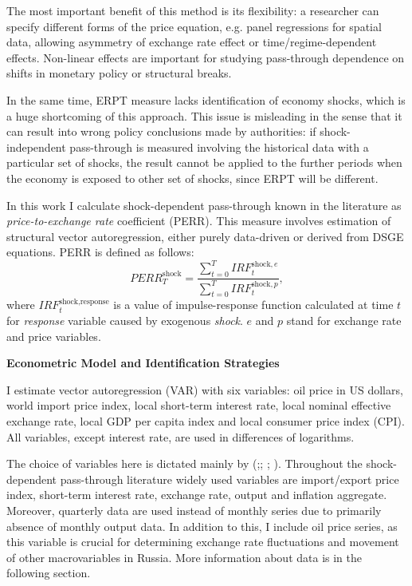 \documentclass[12pt, a4paper]{extarticle}
\begin{document}
The most important benefit of this method is its flexibility: a researcher can specify different forms of the price equation, e.g. panel regressions for spatial data, allowing asymmetry of exchange rate effect or time/regime-dependent effects. Non-linear effects are important for studying pass-through dependence on shifts in monetary policy or structural breaks. 

In the same time, ERPT measure lacks identification of economy shocks, which is a huge shortcoming of this approach. This issue is misleading in the sense that it can result into wrong policy conclusions made by authorities: if shock-independent pass-through is measured involving the historical data with a particular set of shocks, the result cannot be applied to the further periods when the economy is exposed to other set of shocks, since ERPT will be different.

In this work I calculate shock-dependent pass-through known in the literature as \textit{price-to-exchange rate} coefficient (PERR). This measure involves estimation of structural vector autoregression, either purely data-driven or derived from DSGE equations. PERR is defined as follows:
\begin{equation}
	PERR^{\text{shock}}_{T} = \frac{\sum_{t=0}^{T}IRF^{\text{shock}, e}_{t}}{\sum_{t=0}^{T}IRF_{t}^{\text{shock}, p}},
\end{equation}
where $IRF^{\text{shock}, \text{response}}_{t}$ is a value of impulse-response function calculated at time $t$ for \textit{response} variable caused by exogenous \textit{shock}. $e$ and $p$ stand for exchange rate and price variables.

\begin{center}
	\textbf{Econometric Model and Identification Strategies}
\end{center}

I estimate vector autoregression (VAR) with six variables: oil price in US dollars, world import price index, local short-term interest rate, local nominal effective exchange rate, local GDP per capita index and local consumer price index (CPI). All variables, except interest rate, are used in differences of logarithms.

The choice of variables here is dictated mainly by (\cite{Hahn2003};\cite{Comunale2017}; \cite{Forbes2018}; \cite{LeivaLeon2019}). Throughout the shock-dependent pass-through literature widely used variables are import/export price index, short-term interest rate, exchange rate, output and inflation aggregate. Moreover, quarterly data are used instead of monthly series due to primarily absence of monthly output data. In addition to this, I include oil price series, as this variable is crucial for determining exchange rate fluctuations and movement of other macrovariables in Russia. More information about data is in the following section.
\end{document}
